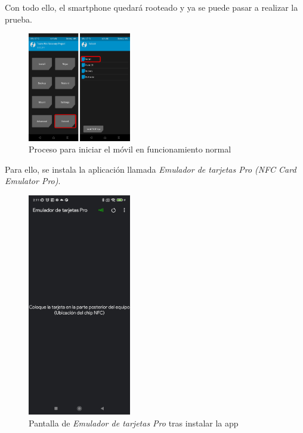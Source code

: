 \documentclass[12pt,a4paper,onecolumn,oneside]{report}
\begin{document}
Con todo ello, el smartphone quedará rooteado y ya se puede pasar a realizar la prueba.

\begin{figure}[H] 
\centering
  \includegraphics[width=0.4\textwidth]{figuras/root55.png}
  \caption[Proceso para iniciar el móvil en funcionamiento normal]{Proceso para iniciar el móvil en funcionamiento normal\\
  }
  \label{fig:root55}
\end{figure}

Para ello, se instala la aplicación llamada \textit{Emulador de tarjetas Pro (NFC Card Emulator Pro)}. 


\begin{figure}[H] 
\centering
  \includegraphics[width=0.4\textwidth]{figuras/root6.png}
  \caption[Pantalla de \textit{Emulador de tarjetas Pro} tras instalar la app]{Pantalla de \textit{Emulador de tarjetas Pro} tras instalar la app\\
  }
  \label{fig:root6}
\end{figure}
\end{document}
